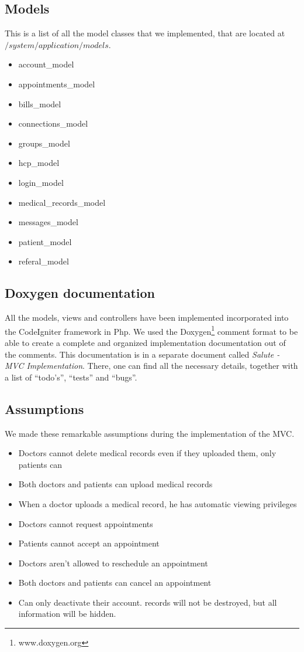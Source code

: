 \subsection{Models}
This is a list of all the model classes that we implemented, that are located at $/system/application/models$.

\begin{itemize}
\item account\_model
\item appointments\_model
\item bills\_model
\item connections\_model
\item groups\_model
\item hcp\_model
\item login\_model
\item medical\_records\_model
\item messages\_model
\item patient\_model
\item referal\_model
\end{itemize}

\subsection{Doxygen documentation}
All the models, views and controllers have been implemented incorporated into the CodeIgniter framework in Php. We used the Doxygen\footnote{www.doxygen.org} comment format to be able to create a complete and organized implementation documentation out of the comments. This documentation is in a separate document called \emph{Salute - MVC Implementation}. There, one can find all the necessary details, together with a list of ``todo's'', ``tests'' and  ``bugs''.

\subsection{Assumptions}
We made these remarkable assumptions during the implementation of the MVC.
\begin{itemize}
\item Doctors cannot delete medical records even if they uploaded them, only patients can
\item Both doctors and patients can upload medical records
\item When a doctor uploads a medical record, he has automatic viewing privileges
\item Doctors cannot request appointments
\item Patients cannot accept an appointment
\item Doctors aren't allowed to reschedule an appointment
\item Both doctors and patients can cancel an appointment
\item Can only deactivate their account. records will not be destroyed, but all information will be hidden. 
\end{itemize}

